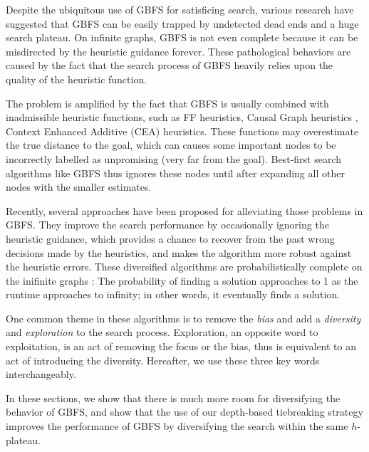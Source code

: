 Despite the ubiquitous use of GBFS for satisficing search,
various research have suggested that GBFS can be
easily trapped by undetected dead ends and a huge search plateau.
On infinite graphs, GBFS is not even complete \cite{Valenzano2016}
because it can be misdirected by the heuristic guidance forever.
These pathological behaviors are caused by the fact that 
the search process of GBFS heavily relies upon the
quality of the heuristic function.

The problem is amplified by the fact that GBFS is usually combined
with inadmissible heuristic functions, such as FF
heuristics\cite{Hoffmann01}, Causal Graph heuristics \cite{Helmert2006}, Context Enhanced
Additive (CEA) heuristics\cite{helmert2008unifying}.
These functions may overestimate the true distance to the goal,
which can causes some important nodes to be incorrectly labelled as unpromising
(very far from the goal). Best-first search algorithms like GBFS thus
ignores these nodes until after expanding all other nodes with the smaller estimates.

Recently, several approaches
\cite{imai2011novel,valenzano2014comparison,xie14type} have been
proposed for alleviating those problems in GBFS. They improve the search
performance by occasionally ignoring the heuristic guidance, which
provides a chance to recover from the past wrong decisions made by the
heuristics, and makes the algorithm more robust against the heuristic
errors.  These diversified algorithms are probabilistically complete on
the inifinite graphs \cite{Valenzano2016}: The probability of finding a
solution approaches to 1 as the runtime approaches to infinity; in other
words, it eventually finds a solution.


One common theme in these algorithms is to remove the \emph{bias} and
add a \emph{diversity} and \emph{exploration} to the search process.
Exploration, an opposite word to exploitation, is an act of removing
the focus or the bias, thus is equivalent to an act of introducing the
diversity. Hereafter, we use these three key words interchangeably.

In these sections, we show that there is much more room for diversifying
the behavior of GBFS, and show that the use of our depth-based
tiebreaking strategy improves the performance of GBFS by
diversifying the search within the same $h$-plateau.
 
